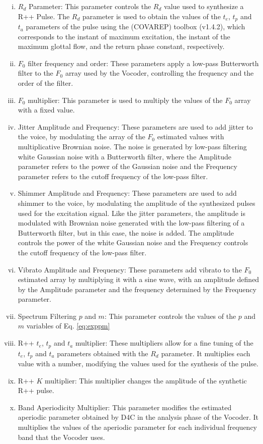 \documentclass[final,5p,times,twocolumn]{elsarticle}
\begin{document}
\begin{enumerate}[i)]
    \item $R_d$ Parameter: This parameter controls the $R_d$ value used to synthesize a R++ Pulse. The $R_d$ parameter is used to obtain the values of the $t_e$, $t_p$ and $t_a$ parameters of the pulse using the (COVAREP) toolbox \cite{Degottex2014_covarep}(v1.4.2), which corresponds to the instant of maximum excitation, the instant of the maximum glottal flow, and the return phase constant, respectively.
    \item $F_0$ filter frequency and order: These parameters apply a low-pass Butterworth filter to the $F_0$ array used by the Vocoder, controlling the frequency and the order of the filter.
    \item $F_0$ multiplier: This parameter is used to multiply the values of the $F_0$ array with a fixed value.
    \item Jitter Amplitude and Frequency: These parameters are used to add jitter to the voice, by modulating the array of the $F_0$ estimated values with multiplicative Brownian noise. The noise is generated by low-pass filtering white Gaussian noise with a Butterworth filter, where the Amplitude parameter refers to the power of the Gaussian noise and the Frequency parameter refers to the cutoff frequency of the low-pass filter.
    \item Shimmer Amplitude and Frequency: These parameters are used to add shimmer to the voice, by modulating the amplitude of the synthesized pulses used for the excitation signal. Like the jitter parameters, the amplitude is modulated with Brownian noise generated with the low-pass filtering of a Butterworth filter, but in this case, the noise is added. The amplitude controls the power of the white Gaussian noise and the Frequency controls the cutoff frequency of the low-pass filter.
    \item Vibrato Amplitude and Frequency: These parameters add vibrato to the $F_0$ estimated array by multiplying it with a sine wave, with an amplitude defined by the Amplitude parameter and the frequency determined by the Frequency parameter.
    \item Spectrum Filtering $p$ and $m$: This parameter controls the values of the $p$ and $m$ variables of Eq. \ref{eq:exppm}
    \item R++ $t_e$, $t_p$ and $t_a$ multiplier: These multipliers allow for a fine tuning of the $t_e$, $t_p$ and $t_a$ parameters obtained with the $R_d$ parameter. It multiplies each value with a number, modifying the values used for the synthesis of the pulse.
    \item R++ $K$ multiplier: This multiplier changes the amplitude of the synthetic R++ pulse.
    \item Band Aperiodicity Multiplier: This parameter modifies the estimated aperiodic parameter obtained by D4C in the analysis phase of the Vocoder. It multiplies the values of the aperiodic parameter for each individual frequency band that the Vocoder uses.
\end{enumerate}
\end{document}
